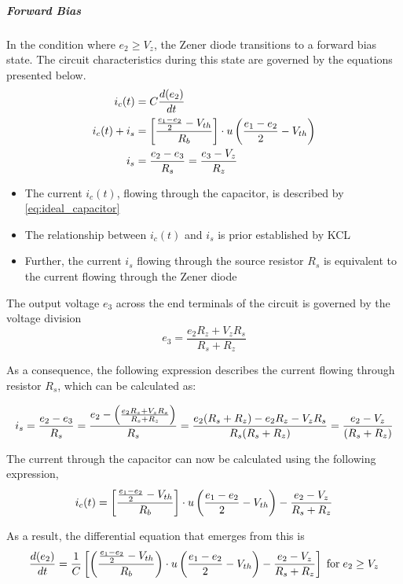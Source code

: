\subparagraph{Forward Bias}
In the condition where $e_2 \geq V_z$, the Zener diode transitions to a forward bias state. The circuit characteristics during this state are governed by the equations presented below.
\begin{align}
    i_c(t) &= C\frac{d(e_2)}{dt}\\
    i_c(t) + i_s &= \left[\frac{\frac{e_1 - e_2}{2} - V_{th}}{R_b} \right]\cdot u\left(\frac{e_1 - e_2}{2} - V_{th} \right)\\
    i_s &= \frac{e_2-e_3}{R_s}=\frac{e_3-V_z}{R_z}
\end{align}
\begin{itemize}
	\item The current $i_c(t)$, flowing through the capacitor, is described by \eqref{eq:ideal_capacitor}
	\item The relationship between $i_c(t)$ and $i_s$ is prior established by KCL
	\item Further, the current $i_s$ flowing through the source resistor $R_s$ is equivalent to the current flowing through the Zener diode
\end{itemize}

The output voltage $e_3$ across the end terminals of the circuit is governed by the voltage division
\begin{equation}
    e_3=\frac{e_2R_z+V_zR_s}{R_s+R_z}
\end{equation}

As a consequence, the following expression describes the current flowing through resistor $R_s$, which can be calculated as:

\begin{equation}
    i_s=\frac{e_2-e_3}{R_s}=\frac{e_2-\left(\frac{e_2R_z+V_zR_s}{R_s+R_z} \right)}{R_s}=\frac{e_2(R_s+R_z)-e_2R_z-V_zR_s}{R_s(R_s+R_z)}=\frac{e_2-V_z}{(R_s+R_z)}
\end{equation}

The current through the capacitor can now be calculated using the following expression,
\begin{equation}
    i_c(t) = \left[\frac{\frac{e_1 - e_2}{2} - V_{th}}{R_b} \right]\cdot u\left(\frac{e_1 - e_2}{2} - V_{th} \right)-\frac{e_2-V_z}{R_s+R_z}
\end{equation}

As a result, the differential equation that emerges from this is
\begin{equation}
    \frac{d(e_2)}{dt}=\frac{1}{C}\left[\left(\frac{\frac{e_1 - e_2}{2} - V_{th}}{R_b} \right)\cdot u\left(\frac{e_1 - e_2}{2} - V_{th} \right)-\frac{e_2-V_z}{R_s+R_z} \right] \hspace{0.1cm} \text{for} \hspace{0.1cm} e_2 \geq V_z
    \label{eq:noLoad_diffEq2}
\end{equation}

